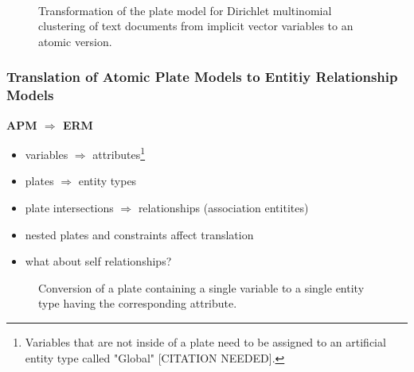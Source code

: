 \begin{figure}[t]
\begin{minipage}[t]{0.49\linewidth}
	\begin{center}
	\end{center}
\end{minipage}
\hspace{0.0cm}
\begin{minipage}[t]{0.49\linewidth}
	\begin{center}
	\end{center}
\end{minipage}\\
\caption{Transformation of the plate model for Dirichlet multinomial clustering of text documents from implicit vector variables to an atomic version.}
\label{img:clustering_platemodels}
\end{figure}

\subsubsection{Translation of Atomic Plate Models to Entitiy Relationship Models}

\textbf{APM $\Rightarrow$ ERM}
\begin{itemize}
\item variables $\Rightarrow$ attributes\footnote{Variables that are not inside of a plate need to be assigned to an artificial entity type called "Global" [CITATION NEEDED].}
\item plates $\Rightarrow$ entity types
\item plate intersections $\Rightarrow$ relationships (association entitites)
\item nested plates and constraints affect translation
\item what about self relationships?
\end{itemize}

\begin{figure}
\centering
\scalebox{\tikzScale}{\adjustTikzSize }
\caption{Conversion of a plate containing a single variable to a single entity type having the corresponding attribute.}\label{fig:pm2erm_uno_local}
\end{figure}

